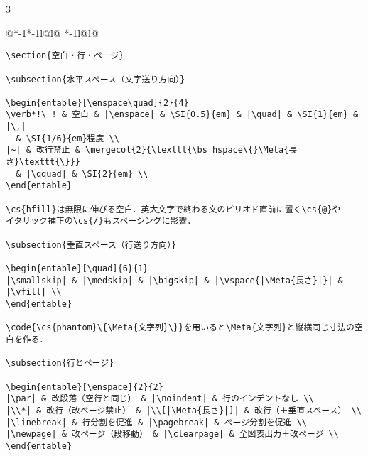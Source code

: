 \documentclass[10pt,a4paper,landscape,dvipdfmx]{jarticle}
\makeatletter
\def\set@etsep#1#2{\def\etcolsep{#1}\def\etitemsep{#2}}
\newenvironment{entable}[3][\quad\qquad]{%
  \set@etsep#1\relax\relax
  \begin{tabular}{%
    @{}*{\the\numexpr#3-1}{*{\the\numexpr#2-1}{l@{\etcolsep}}l@{\etitemsep}}%
    *{\the\numexpr#2-1}{l@{\etcolsep}}l@{}}}{%
  \end{tabular}}
\newcommand{\mergecol}[2]{\multicolumn{#1}{@{}l@{}}{#2}}
\newcommand*\eghostguarded{%
  \ifmmode \expandafter\@firstofone
  \else \expandafter\pxqgg@eghostguarded@a
  \fi}
\def\pxqgg@eghostguarded@a#1{%
  {\pxqgg@TI\pxqgg@cwm}%
  #1%
  {\pxqgg@TI\pxqgg@cwm}}
\newcommand{\codefont}{\ttfamily\gtfamily}
\newcommand{\cs}[1]{\eghostguarded{{\codefont \bs #1}}}
\newcommand{\code}[1]{\eghostguarded{{\codefont #1}}}
\newcommand{\Meta}[1]{$\langle$\mbox{}\emph{#1}\mbox{}$\rangle$}
\makeatother
\begin{document}
\begin{multicols}{3}
\begin{entable}[\enspace]{2}{1}
\begin{verbatim}
\section{空白・行・ページ}

\subsection{水平スペース（文字送り方向）}

\begin{entable}[\enspace\quad]{2}{4}
\verb*!\ ! & 空白 & |\enspace| & \SI{0.5}{em} & |\quad| & \SI{1}{em} & |\,|
  & \SI{1/6}{em}程度 \\
|~| & 改行禁止 & \mergecol{2}{\texttt{\bs hspace\{}\Meta{長さ}\texttt{\}}}
  & |\qquad| & \SI{2}{em} \\
\end{entable}

\cs{hfill}は無限に伸びる空白．英大文字で終わる文のピリオド直前に置く\cs{@}や
イタリック補正の\cs{/}もスペーシングに影響．

\subsection{垂直スペース（行送り方向）}

\begin{entable}[\quad]{6}{1}
|\smallskip| & |\medskip| & |\bigskip| & |\vspace{|\Meta{長さ}|}| & |\vfill| \\
\end{entable}

\code{\cs{phantom}\{\Meta{文字列}\}}を用いると\Meta{文字列}と縦横同じ寸法の空白を作る．

\subsection{行とページ}

\begin{entable}[\enspace]{2}{2}
|\par| & 改段落（空行と同じ） & |\noindent| & 行のインデントなし \\
|\\*| & 改行（改ページ禁止） & |\\[|\Meta{長さ}|]| & 改行（＋垂直スペース） \\
|\linebreak| & 行分割を促進 & |\pagebreak| & ページ分割を促進 \\
|\newpage| & 改ページ（段移動） & |\clearpage| & 全図表出力＋改ページ \\
\end{entable}


\end{verbatim}
\end{entable}
\end{multicols}
\end{document}
